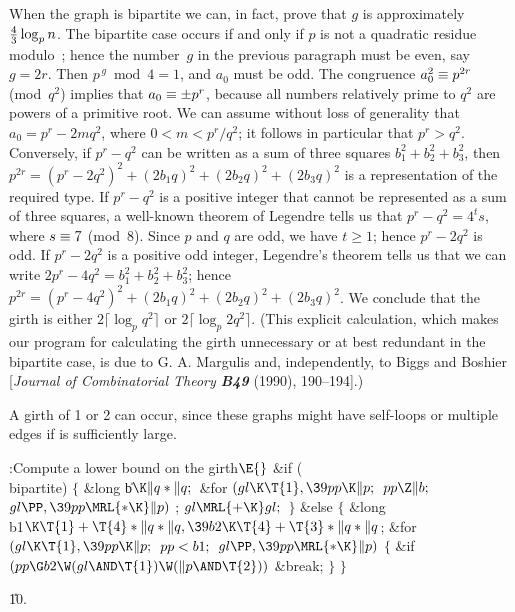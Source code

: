 When the graph is bipartite we can, in fact, prove that $g$ is
approximately ${4\over3}\log_p n$. The bipartite case occurs if and
only if $p$ is not a quadratic residue modulo~; hence the
number~$g$ in the previous paragraph must be even, say $g=2r$. Then
$p^{\,g}\bmod4=1$, and $a_0$ must be odd.  The congruence $a_0^2\=p^{2r}$
(mod~$q^2$) implies that $a_0\=\pm p^r$, because all numbers
relatively prime to $q^2$ are powers of a primitive root. We can
assume without loss of generality that $a_0=p^r-2mq^2$, where
$0<m<p^r/q^2$; it follows in particular that $p^r>q^2$.  Conversely,
if $p^r-q^2$ can be written as a sum of three squares
$b_1^2+b_2^2+b_3^2$, then
$p^{2r}=(p^r-2q^2)^2+(2b_1q)^2+(2b_2q)^2+(2b_3q)^2$ is a
representation of the required type. If $p^r-q^2$ is a positive
integer that cannot be represented as a sum of three squares, a
well-known theorem of Legendre tells us that $p^r-q^2=4^ts$, where
$s\=7$ (mod~8).  Since $p$ and $q$ are odd, we have $t\ge1$; hence
$p^r-2q^2$ is odd. If $p^r-2q^2$ is a positive odd integer, Legendre's
theorem tells us that we can write $2p^r-4q^2=b_1^2+b_2^2+b_3^2$;
hence $p^{2r}=(p^r-4q^2)^2+ (2b_1q)^2+(2b_2q)^2+(2b_3q)^2$. We
conclude that the girth is either $2\lceil\log_pq^2\rceil$ or
$2\lceil\log_p2q^2\rceil$. (This explicit calculation, which makes our
program for calculating the girth unnecessary or at best redundant in
the bipartite case, is due to G. A. Margulis and, independently, to
Biggs and Boshier [{\sl Journal of Combinatorial Theory\/ \bf B49}
(1990), 190--194].)

A girth of 1 or 2 can occur, since these graphs might have self-loops
or multiple edges if  is sufficiently large.

\Y\B\4:Compute a lower bound  on the girth\X${}\E{}$\6
\&{if} (\\{bipartite})\5
${}\{{}$\5
\1\&{long} \|b${}\K\|q*\|q;{}$\7
\&{for} ${}(\\{gl}\K\T{1},\39\\{pp}\K\|p;{}$ ${}\\{pp}\Z\|b;{}$ ${}\\{gl}\PP,%
\39\\{pp}\MRL{*{\K}}\|p){}$\1\5
;\2\6
${}\\{gl}\MRL{+{\K}}\\{gl};{}$\6
\4${}\}{}$\5
\2\&{else}\5
${}\{{}$\5
\1\&{long} \\{b1}${}\K\T{1}+\T{4}*\|q*\|q,\39\\{b2}\K\T{4}+\T{3}*\|q*\|q{}$;\7
\&{for} ${}(\\{gl}\K\T{1},\39\\{pp}\K\|p;{}$ ${}\\{pp}<\\{b1};{}$ ${}\\{gl}\PP,%
\39\\{pp}\MRL{*{\K}}\|p){}$\5
${}\{{}$\1\6
\&{if} ${}(\\{pp}\G\\{b2}\W(\\{gl}\AND\T{1})\W(\|p\AND\T{2})){}$\1\5
\&{break};\2\6
\4${}\}{}$\2\6
\4${}\}{}$\2\par
\U10.\fi

